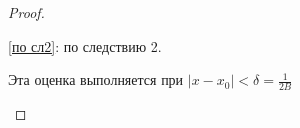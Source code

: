 \begin{proof}
\begin{enumerate}
\begin{enumerate}
                        \ref{по сл2}: по следствию 2.

                        Эта оценка выполняется при \(|x - x_0|< \delta = \frac{1}{2B}\)
              \end{enumerate}
    \end{enumerate}
\end{proof}

